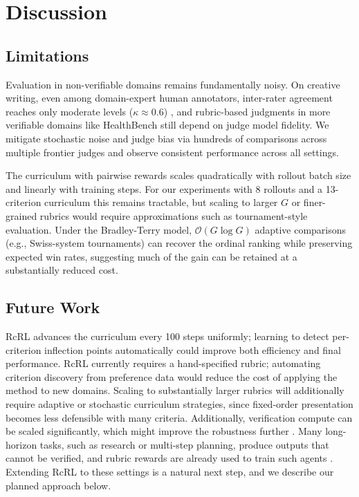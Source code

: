 \documentclass{article}
\theoremstyle{plain}
\theoremstyle{definition}
\theoremstyle{remark}
\begin{document}
\section{Discussion}

\subsection{Limitations}
Evaluation in non-verifiable domains remains fundamentally noisy. On creative writing, even among domain-expert human annotators, inter-rater agreement reaches only moderate levels ($\kappa \approx 0.6$) \citep{gomez-rodriguez-williams-2023-confederacy}, and rubric-based judgments in more verifiable domains like HealthBench still depend on judge model fidelity. We mitigate stochastic noise and judge bias via hundreds of comparisons across multiple frontier judges and observe consistent performance across all settings.

The curriculum with pairwise rewards scales quadratically with rollout batch size and linearly with training steps. For our experiments with 8 rollouts and a 13-criterion curriculum this remains tractable, but scaling to larger $G$ or finer-grained rubrics would require approximations such as tournament-style evaluation. Under the Bradley-Terry model, $\mathcal{O}(G \log G)$ adaptive comparisons (e.g., Swiss-system tournaments) can recover the ordinal ranking while preserving expected win rates, suggesting much of the gain can be retained at a substantially reduced cost.




\subsection{Future Work}
\label{sec:futurework}
RcRL advances the curriculum every 100 steps uniformly; learning to detect per-criterion inflection points automatically could improve both efficiency and final performance. RcRL currently requires a hand-specified rubric; automating criterion discovery from preference data would reduce the cost of applying the method to new domains. Scaling to substantially larger rubrics will additionally require adaptive or stochastic curriculum strategies, since fixed-order presentation becomes less defensible with many criteria. Additionally, verification compute can be scaled significantly, which might improve the robustness further \citep{singh2026v1unifyinggenerationselfverification, venkatraman2026recursiveselfaggregationunlocksdeep}. Many long-horizon tasks, such as research or multi-step planning, produce outputs that cannot be verified, and rubric rewards are already used to train such agents \citep{goel2025trainingaicoscientistsusing}. Extending RcRL to these settings is a natural next step, and we describe our planned approach below.
\end{document}

